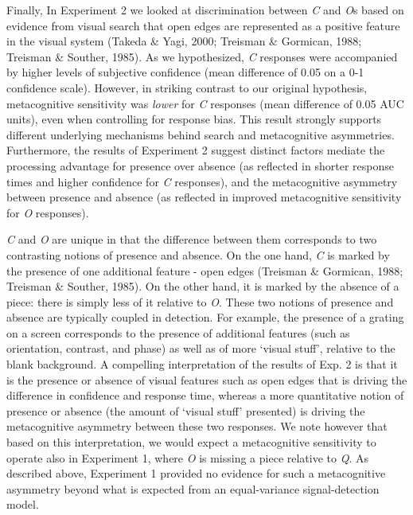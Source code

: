 \documentclass[12pt,twoside]{reedthesis}
\begin{document}
Finally, In Experiment 2 we looked at discrimination between \emph{C} and \emph{O}s based on evidence from visual search that open edges are represented as a positive feature in the visual system (Takeda \& Yagi, 2000; Treisman \& Gormican, 1988; Treisman \& Souther, 1985). As we hypothesized, \emph{C} responses were accompanied by higher levels of subjective confidence (mean difference of 0.05 on a 0-1 confidence scale). However, in striking contrast to our original hypothesis, metacognitive sensitivity was \emph{lower} for \emph{C} responses (mean difference of 0.05 AUC units), even when controlling for response bias. This result strongly supports different underlying mechanisms behind search and metacognitive asymmetries. Furthermore, the results of Experiment 2 suggest distinct factors mediate the processing advantage for presence over absence (as reflected in shorter response times and higher confidence for \emph{C} responses), and the metacognitive asymmetry between presence and absence (as reflected in improved metacognitive sensitivity for \emph{O} responses).

\emph{C} and \emph{O} are unique in that the difference between them corresponds to two contrasting notions of presence and absence. On the one hand, \emph{C} is marked by the presence of one additional feature - open edges (Treisman \& Gormican, 1988; Treisman \& Souther, 1985). On the other hand, it is marked by the absence of a piece: there is simply less of it relative to \emph{O}. These two notions of presence and absence are typically coupled in detection. For example, the presence of a grating on a screen corresponds to the presence of additional features (such as orientation, contrast, and phase) as well as of more `visual stuff', relative to the blank background. A compelling interpretation of the results of Exp. 2 is that it is the presence or absence of visual features such as open edges that is driving the difference in confidence and response time, whereas a more quantitative notion of presence or absence (the amount of `visual stuff' presented) is driving the metacognitive asymmetry between these two responses. We note however that based on this interpretation, we would expect a metacognitive sensitivity to operate also in Experiment 1, where \emph{O} is missing a piece relative to \emph{Q}. As described above, Experiment 1 provided no evidence for such a metacognitive asymmetry beyond what is expected from an equal-variance signal-detection model.
\end{document}
